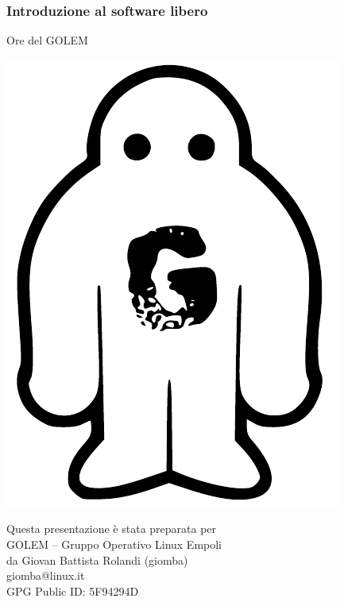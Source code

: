 \documentclass{beamer}
\begin{document}
\begin{frame}
  \frametitle{Introduzione al software libero}

    \begin{block}{Ore del GOLEM}
    \centering
    \begin{minipage}{.1\linewidth}
      \includegraphics[width=.9\linewidth]{img/GOLEM-logo.pdf}
    \end{minipage}
    \begin{minipage}{.8\linewidth}
    \centering
    Questa presentazione è stata preparata per\\
    GOLEM -- Gruppo Operativo Linux Empoli\\
    da Giovan Battista Rolandi (giomba)\\
    giomba@linux.it\\
    GPG Public ID: 5F94294D
    \end{minipage}
    \end{block}


\end{frame}
\end{document}
